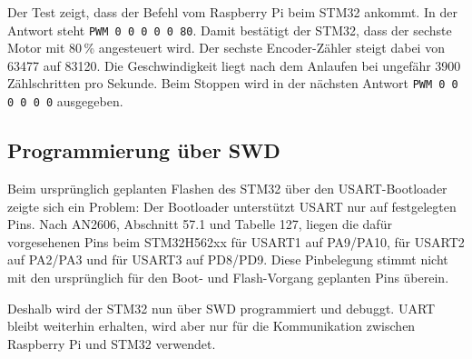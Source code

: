 Der Test zeigt, dass der Befehl vom Raspberry Pi beim STM32 ankommt. In der Antwort steht \texttt{PWM 0 0 0 0 0 80}. Damit bestätigt der STM32, dass der sechste Motor mit 80\,\% angesteuert wird. Der sechste Encoder-Zähler steigt dabei von 63477 auf 83120. Die Geschwindigkeit liegt nach dem Anlaufen bei ungefähr 3900 Zählschritten pro Sekunde. Beim Stoppen wird in der nächsten Antwort \texttt{PWM 0 0 0 0 0 0} ausgegeben.

\subsection{Programmierung über SWD}
Beim ursprünglich geplanten Flashen des STM32 über den USART-Bootloader zeigte sich ein Problem: Der Bootloader unterstützt USART nur auf festgelegten Pins. Nach AN2606, Abschnitt 57.1 und Tabelle 127, liegen die dafür vorgesehenen Pins beim STM32H562xx für USART1 auf PA9/PA10, für USART2 auf PA2/PA3 und für USART3 auf PD8/PD9. Diese Pinbelegung stimmt nicht mit den ursprünglich für den Boot- und Flash-Vorgang geplanten Pins überein.

Deshalb wird der STM32 nun über SWD programmiert und debuggt. UART bleibt weiterhin erhalten, wird aber nur für die Kommunikation zwischen Raspberry Pi und STM32 verwendet.



